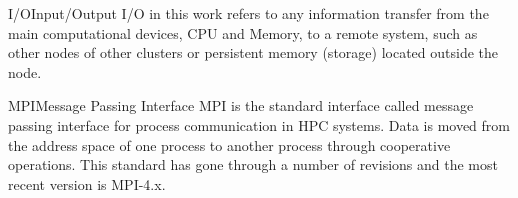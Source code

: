 {I/O}{Input/Output}{
    I/O in this work refers to any information transfer from the main
    computational devices, CPU and Memory, to a remote system, such as
    other nodes of other clusters or persistent memory (storage) located outside
    the node.
}

{MPI}{Message Passing Interface}{
	MPI is the standard interface called message passing interface for process communication in HPC systems. Data is moved from the address space of one process to another process through cooperative operations. This standard has gone through a number of revisions and the most recent version is MPI-4.x.
}


